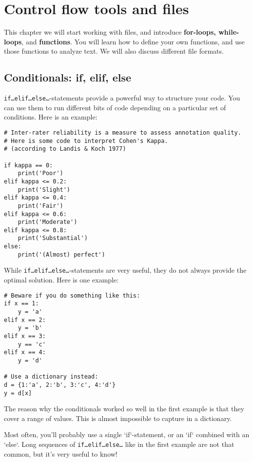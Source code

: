 \documentclass[12pt]{book}
\begin{document}
\chapter{Control flow tools and files}

This chapter we will start working with files, and introduce \textbf{for-loops, while-loops}, and \textbf{functions}.
You will learn how to define your own functions, and use those functions to analyze
text. We will also discuss different file formats.

\section{Conditionals: if, elif, else}

\texttt{if\ldots elif\ldots else\ldots}-statements provide a powerful way to structure your code. You can use them to run different bits of code depending on a particular set of conditions. Here is an example:

\begin{lstlisting}
# Inter-rater reliability is a measure to assess annotation quality.
# Here is some code to interpret Cohen's Kappa.
# (according to Landis & Koch 1977)

if kappa == 0:
	print('Poor')
elif kappa <= 0.2:
	print('Slight')
elif kappa <= 0.4:
	print('Fair')
elif kappa <= 0.6:
	print('Moderate')
elif kappa <= 0.8:
	print('Substantial')
else:
	print('(Almost) perfect')
\end{lstlisting}

While \texttt{if\ldots elif\ldots else\ldots}-statements are very useful, they do not always provide the optimal solution. Here is one example:

\begin{lstlisting}
# Beware if you do something like this:
if x == 1:
	y = 'a'
elif x == 2:
	y = 'b'
elif x == 3:
	y == 'c'
elif x == 4:
	y = 'd'

# Use a dictionary instead:
d = {1:'a', 2:'b', 3:'c', 4:'d'}
y = d[x]
\end{lstlisting}

The reason why the conditionals worked so well in the first example is that they cover a range of values. This is almost impossible to capture in a dictionary.

Most often, you'll probably use a single `if`-statement, or an `if` combined with an `else`. Long sequences of \texttt{if\ldots elif\ldots else\ldots} like in the first example are not that common, but it's very useful to know!
\end{document}
